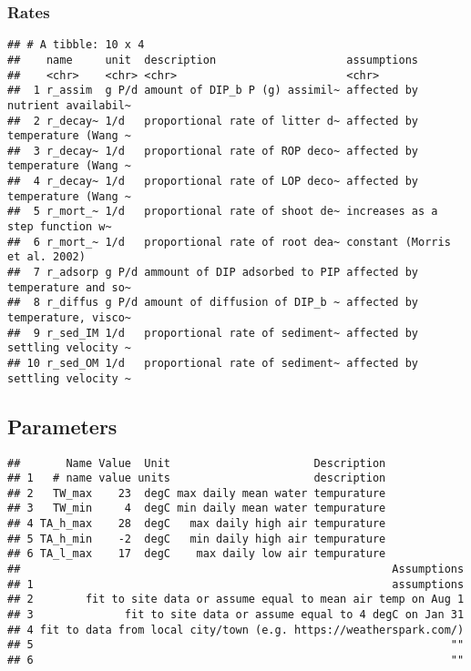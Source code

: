 \documentclass[
]{article}
\begin{document}
\hypertarget{rates}{%
\subsubsection{Rates}\label{rates}}

\begin{verbatim}
## # A tibble: 10 x 4
##    name     unit  description                    assumptions                    
##    <chr>    <chr> <chr>                          <chr>                          
##  1 r_assim  g P/d amount of DIP_b P (g) assimil~ affected by nutrient availabil~
##  2 r_decay~ 1/d   proportional rate of litter d~ affected by temperature (Wang ~
##  3 r_decay~ 1/d   proportional rate of ROP deco~ affected by temperature (Wang ~
##  4 r_decay~ 1/d   proportional rate of LOP deco~ affected by temperature (Wang ~
##  5 r_mort_~ 1/d   proportional rate of shoot de~ increases as a step function w~
##  6 r_mort_~ 1/d   proportional rate of root dea~ constant (Morris et al. 2002)  
##  7 r_adsorp g P/d ammount of DIP adsorbed to PIP affected by temperature and so~
##  8 r_diffus g P/d amount of diffusion of DIP_b ~ affected by temperature, visco~
##  9 r_sed_IM 1/d   proportional rate of sediment~ affected by settling velocity ~
## 10 r_sed_OM 1/d   proportional rate of sediment~ affected by settling velocity ~
\end{verbatim}

\hypertarget{parameters}{%
\subsection{Parameters}\label{parameters}}

\begin{verbatim}
##       Name Value  Unit                      Description
## 1   # name value units                      description
## 2   TW_max    23  degC max daily mean water tempurature
## 3   TW_min     4  degC min daily mean water tempurature
## 4 TA_h_max    28  degC   max daily high air tempurature
## 5 TA_h_min    -2  degC   min daily high air tempurature
## 6 TA_l_max    17  degC    max daily low air tempurature
##                                                         Assumptions
## 1                                                       assumptions
## 2        fit to site data or assume equal to mean air temp on Aug 1
## 3              fit to site data or assume equal to 4 degC on Jan 31
## 4 fit to data from local city/town (e.g. https://weatherspark.com/)
## 5                                                                ""
## 6                                                                ""
\end{verbatim}
\end{document}
